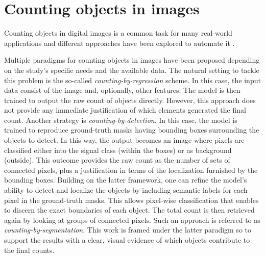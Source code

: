 \section{Counting objects in images}
\label{sec:counting_objs}

Counting objects in digital images is a common task for many real-world applications \cite{segui2015learning, arteta2016counting, paul2017countception, rahnemoonfar2017deepfruit} and different approaches have been explored to automate it \cite{lempitsky2010learning, ciresan2012deep, cirecsan2013mitosis, Kraus2016, Raza2017}. 

Multiple paradigms for counting objects in images have been proposed depending on the study's specific needs and the available data.
The natural setting to tackle this problem is the so-called \textit{counting-by-regression} scheme. 
In this case, the input data consist of the image and, optionally, other features. 
The model is then trained to output the raw count of objects directly. However, this approach does not provide any immediate justification of which elements generated the final count.
Another strategy is \textit{counting-by-detection}.
In this case, the model is trained to reproduce ground-truth masks having bounding boxes surrounding the objects to detect. 
In this way, the output becomes an image where pixels are classified either into the signal class (within the boxes) or as background (outside). 
This outcome provides the raw count as the number of sets of connected pixels, plus a justification in terms of the localization furnished by the bounding boxes. 
Building on the latter framework, one can refine the model's ability to detect and localize the objects by including semantic labels for each pixel in the ground-truth masks. This allows pixel-wise classification that enables to discern the exact boundaries of each object. The total count is then retrieved again by looking at groups of connected pixels. Such an approach is referred to as \textit{counting-by-segmentation}.
This work is framed under the latter paradigm so to support the results with a clear, visual evidence of which objects contribute to the final counts.

